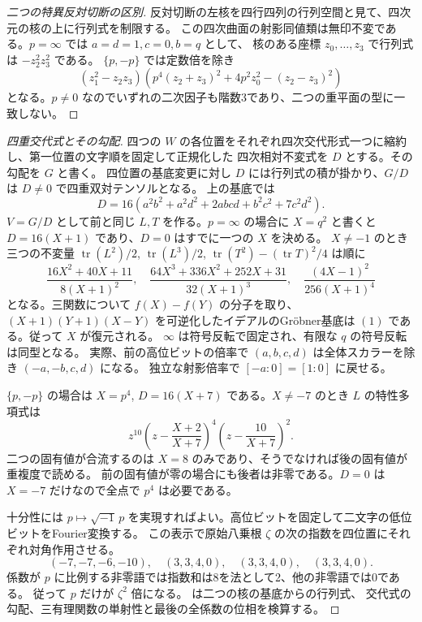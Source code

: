 \begin{proof}[二つの特異反対切断の区別]
反対切断の左核を四行四列の行列空間と見て、四次元の核の上に行列式を制限する。
この四次曲面の射影同値類は無印不変である。$p=\infty$ では $a=d=1,c=0,b=q$ として、
核のある座標 $z_0,\ldots,z_3$ で行列式は $-z_2^2 z_3^2$ である。
$\{p,-p\}$ では定数倍を除き
\[
 (z_1^2-z_2z_3)
 \left(p^4(z_2+z_3)^2+4p^2 z_0^2-(z_2-z_3)^2\right)
\]
となる。$p\ne0$ なのでいずれの二次因子も階数3であり、二つの重平面の型に一致しない。
\end{proof}

\begin{proof}[四重交代式とその勾配]
四つの $W$ の各位置をそれぞれ四次交代形式一つに縮約し、第一位置の文字順を固定して正規化した
四次相対不変式を $D$ とする。その勾配を $G$ と書く。
四位置の基底変更に対し $D$ には行列式の積が掛かり、$G/D$ は $D\ne0$ で四重双対テンソルとなる。
上の基底では
\[
 D=16(a^2b^2+a^2d^2+2abcd+b^2c^2+7c^2d^2).
\]
$V=G/D$ として前と同じ $L,T$ を作る。$p=\infty$ の場合に $X=q^2$ と書くと
$D=16(X+1)$ であり、$D=0$ はすでに一つの $X$ を決める。
$X\ne-1$ のとき三つの不変量 $\operatorname{tr}(L^2)/2$, $\operatorname{tr}(L^3)/2$,
$\operatorname{tr}(T^2)-(\operatorname{tr}T)^2/4$ は順に
\[
 \frac{16X^2+40X+11}{8(X+1)^2},\quad
 \frac{64X^3+336X^2+252X+31}{32(X+1)^3},\quad
 \frac{(4X-1)^2}{256(X+1)^4}
\]
となる。三関数について $f(X)-f(Y)$ の分子を取り、
$(X+1)(Y+1)(X-Y)$ を可逆化したイデアルのGröbner基底は $(1)$ である。従って $X$ が復元される。
$\infty$ は符号反転で固定され、有限な $q$ の符号反転は同型となる。
実際、前の高位ビットの倍率で $(a,b,c,d)$ は全体スカラーを除き $(-a,-b,c,d)$ になる。
独立な射影倍率で $[-a:0]=[1:0]$ に戻せる。

$\{p,-p\}$ の場合は $X=p^4$, $D=16(X+7)$ である。$X\ne-7$ のとき $L$ の特性多項式は
\[
 z^{10}\left(z-\frac{X+2}{X+7}\right)^4\left(z-\frac{10}{X+7}\right)^2 .
\]
二つの固有値が合流するのは $X=8$ のみであり、そうでなければ後の固有値が重複度で読める。
前の固有値が零の場合にも後者は非零である。$D=0$ は $X=-7$ だけなので全点で $p^4$ は必要である。

十分性には $p\mapsto\sqrt{-1}\,p$ を実現すればよい。高位ビットを固定して二文字の低位ビットをFourier変換する。
この表示で原始八乗根 $\zeta$ の次の指数を四位置にそれぞれ対角作用させる。
\[
 (-7,-7,-6,-10),\quad(3,3,4,0),\quad(3,3,4,0),\quad(3,3,4,0).
\]
係数が $p$ に比例する非零語では指数和は8を法として2、他の非零語では0である。
従って $p$ だけが $\zeta^2$ 倍になる。
 は二つの核の基底からの行列式、
交代式の勾配、三有理関数の単射性と最後の全係数の位相を検算する。
\end{proof}

